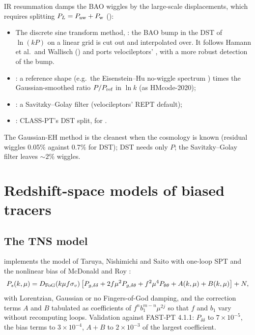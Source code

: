 IR resummation damps the BAO wiggles by the large-scale displacements, which requires splitting $P_L=P_{\rm nw}+P_{\rm w}$
():
\begin{itemize}
\item The discrete sine transform method, : the BAO bump in the DST of $\ln(kP)$ on a linear grid is
      cut out and interpolated over. It follows Hamann et al.\ and Wallisch () and ports velocileptors'
      , with a more robust detection of the bump.
\item {}: a reference shape (e.g.\ the Eisenstein--Hu no-wiggle spectrum \cite{EisensteinHu1998})
      times the Gaussian-smoothed ratio $P/P_{\rm ref}$ in $\ln k$ (as HMcode-2020);
\item {}: a Savitzky--Golay filter (velocileptors' REPT default);
\item {}: CLASS-PT's DST split, for .
\end{itemize}
The Gaussian-EH method is the cleanest when the cosmology is known (residual wiggles 0.05\% against 0.7\% for DST);
DST needs only $P$; the Savitzky--Golay filter leaves $\sim2\%$ wiggles.

\section{Redshift-space models of biased tracers}\label{sec:pt-rsd}

\subsection{The TNS model}

 implements the model of Taruya, Nishimichi and Saito \cite{Taruya2010} with one-loop SPT and the nonlinear
bias of McDonald and Roy \cite{McDonaldRoy2009}:
\begin{equation}
P_s(k,\mu)=D_{\rm FoG}(k\mu f\sigma_v)\left[P_{g,\delta\delta}+2f\mu^2P_{g,\delta\theta}+f^2\mu^4P_{\theta\theta}+A(k,\mu)+B(k,\mu)\right]+N,
\end{equation}
with Lorentzian, Gaussian or no Fingers-of-God damping, and the correction terms $A$ and $B$ tabulated as coefficients of
$f^nb_1^{m-n}\mu^{2j}$ so that $f$ and $b_1$ vary without recomputing loops. Validation against FAST-PT 4.1.1: $P_{\delta\delta}$
to $7\times10^{-5}$, the bias terms to $3\times10^{-4}$, $A+B$ to $2\times10^{-3}$ of the largest coefficient.


